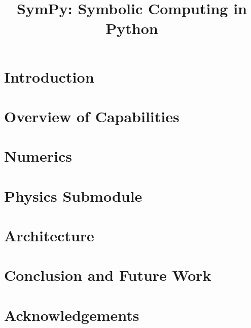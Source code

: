 \documentclass[fleqn,10pt,lineno,numbers]{wlpeerj} %
\title{SymPy: Symbolic Computing in Python}
\begin{document}
\flushbottom
\maketitle
\thispagestyle{empty}

\section{Introduction}




\section{Overview of Capabilities}
\label{sec:features}




\section{Numerics}
\label{sec:numerics}




\section{Physics Submodule}
\label{sec:domain_specific}



\section{Architecture}
\label{sec:architecture}



\section{Conclusion and Future Work}
\label{sec:conclusion}



\section{Acknowledgements}
\label{sec:acknowledgements}




\end{document}
